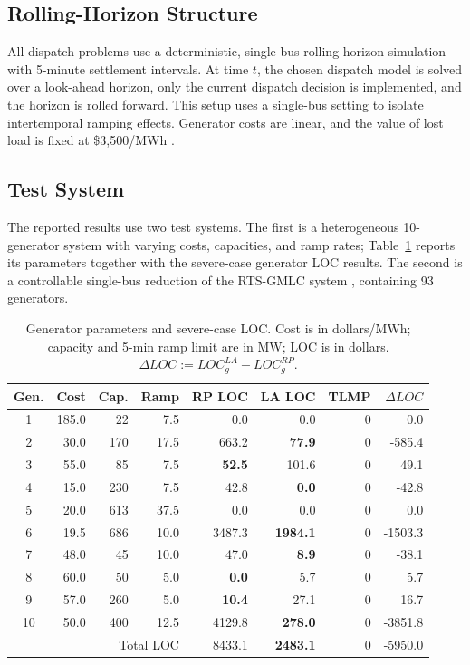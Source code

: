 \documentclass[conference]{IEEEtran}
\begin{document}
\subsection{Rolling-Horizon Structure}
All dispatch problems use a deterministic, single-bus rolling-horizon simulation with 5-minute settlement intervals. At time $t$, the chosen dispatch model is solved over a look-ahead horizon, only the current dispatch decision is implemented, and the horizon is rolled forward. This setup uses a single-bus setting to isolate intertemporal ramping effects. Generator costs are linear, and the value of lost load is fixed at \mbox{\$3{,}500/MWh} \cite{Chen2023}.

\subsection{Test System}
The reported results use two test systems. The first is a heterogeneous 10-generator system with varying costs, capacities, and ramp rates; Table~\ref{tab:gen_loc_example} reports its parameters together with the severe-case generator LOC results. The second is a controllable single-bus reduction of the RTS-GMLC system \cite{Barrows2020RTS}, containing 93 generators.

\begin{table}[!t]
\caption{Generator parameters and severe-case LOC. Cost is in dollars/MWh; capacity and 5-min ramp limit are in MW; LOC is in dollars. $\Delta LOC:=LOC_g^{LA}-LOC_g^{RP}$.}
\label{tab:gen_loc_example}
\centering
\small
\setlength{\tabcolsep}{1.6pt}
\begin{tabular}{crrrrrrr}
\toprule
Gen. & Cost & Cap. & Ramp & RP LOC & LA LOC & TLMP & $\Delta LOC$ \\
\midrule
1  & 185.0 & 22  & 7.5  & 0.0    & 0.0             & 0 & 0.0 \\
2  & 30.0  & 170 & 17.5 & 663.2  & \textbf{77.9}   & 0 & -585.4 \\
3  & 55.0  & 85  & 7.5  & \textbf{52.5} & 101.6    & 0 & 49.1 \\
4  & 15.0  & 230 & 7.5  & 42.8   & \textbf{0.0}    & 0 & -42.8 \\
5  & 20.0  & 613 & 37.5 & 0.0    & 0.0             & 0 & 0.0 \\
6  & 19.5  & 686 & 10.0 & 3487.3 & \textbf{1984.1} & 0 & -1503.3 \\
7  & 48.0  & 45  & 10.0 & 47.0   & \textbf{8.9}    & 0 & -38.1 \\
8  & 60.0  & 50  & 5.0  & \textbf{0.0} & 5.7      & 0 & 5.7 \\
9  & 57.0  & 260 & 5.0  & \textbf{10.4} & 27.1    & 0 & 16.7 \\
10 & 50.0  & 400 & 12.5 & 4129.8 & \textbf{278.0}  & 0 & -3851.8 \\
\midrule
\multicolumn{4}{r}{Total LOC} & 8433.1 & \textbf{2483.1} & 0 & -5950.0 \\
\bottomrule
\end{tabular}
\end{table}
\end{document}
